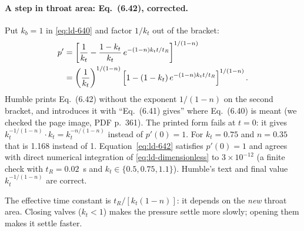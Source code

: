 \paragraph{A step in throat area: Eq.~(6.42), corrected.} Put
$k_b=1$ in \eqref{eq:ld-640} and factor $1/k_t$ out of the bracket:
\begin{align}
 p'&=\left[\frac1{k_t}-\frac{1-k_t}{k_t}\,e^{-(1-n)k_tt/t_R}
     \right]^{1/(1-n)}\notag\\
   &=\left(\frac1{k_t}\right)^{1/(1-n)}
     \left[1-(1-k_t)\,e^{-(1-n)k_tt/t_R}\right]^{1/(1-n)}.
 \label{eq:ld-642}
\end{align}
Humble prints Eq.~(6.42) without the exponent $1/(1-n)$ on the second
bracket, and introduces it with ``Eq.~(6.41) gives'' where Eq.~(6.40)
is meant (we checked the page image, PDF p.~361). The printed form
fails at $t=0$: it gives $k_t^{-1/(1-n)}\cdot k_t=k_t^{-n/(1-n)}$
instead of $p'(0)=1$. For $k_t=0.75$ and $n=0.35$ that is 1.168
instead of 1. Equation~\eqref{eq:ld-642} satisfies $p'(0)=1$ and agrees
with direct numerical integration of \eqref{eq:ld-dimensionless} to
$3\times10^{-12}$ (a finite check with $t_R=0.02$~s and
$k_t\in\{0.5,0.75,1.1\}$). Humble's text and final value
$k_t^{-1/(1-n)}$ are correct.

The effective time constant is $t_R/[k_t(1-n)]$: it depends on the
\emph{new} throat area. Closing valves ($k_t<1$) makes the pressure
settle more slowly; opening them makes it settle faster.

